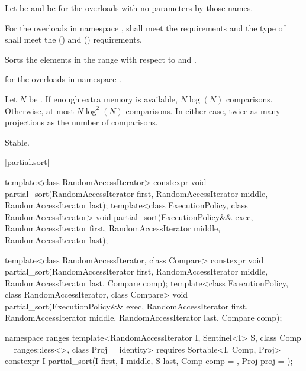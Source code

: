 \begin{itemdescr}
\pnum
Let  be 
and  be 
for the overloads with no parameters by those names.

\pnum
\requires
For the overloads in namespace ,
 shall meet the
 requirements and
the type of  shall meet the
 () and
 () requirements.

\pnum
\effects
Sorts the elements in the range 
with respect to  and .

\pnum
\returns
{} for the overloads in namespace .

\pnum
\complexity
Let $N$ be .
If enough extra memory is available, $N \log(N)$ comparisons.
Otherwise, at most $N \log^2(N)$ comparisons.
In either case, twice as many projections as
the number of comparisons.

\pnum
\remarks Stable.
\end{itemdescr}

[partial.sort]{}

%
\begin{itemdecl}
template<class RandomAccessIterator>
  constexpr void partial_sort(RandomAccessIterator first,
                              RandomAccessIterator middle,
                              RandomAccessIterator last);
template<class ExecutionPolicy, class RandomAccessIterator>
  void partial_sort(ExecutionPolicy&& exec,
                    RandomAccessIterator first,
                    RandomAccessIterator middle,
                    RandomAccessIterator last);

template<class RandomAccessIterator, class Compare>
  constexpr void partial_sort(RandomAccessIterator first,
                              RandomAccessIterator middle,
                              RandomAccessIterator last,
                              Compare comp);
template<class ExecutionPolicy, class RandomAccessIterator, class Compare>
  void partial_sort(ExecutionPolicy&& exec,
                    RandomAccessIterator first,
                    RandomAccessIterator middle,
                    RandomAccessIterator last,
                    Compare comp);

namespace ranges {
  template<RandomAccessIterator I, Sentinel<I> S, class Comp = ranges::less<>,
      class Proj = identity>
    requires Sortable<I, Comp, Proj>
    constexpr I
      partial_sort(I first, I middle, S last, Comp comp = {}, Proj proj = {});
}
\end{itemdecl}


